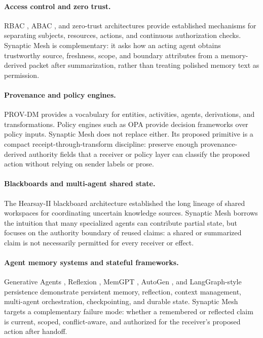\documentclass[11pt]{article}
\begin{document}
\paragraph{Access control and zero trust.}
RBAC \cite{R03_FerraioloKuhn1992_RBAC}, ABAC \cite{R04_Hu2014_ABAC}, and zero-trust
architectures \cite{R05_Rose2020_ZeroTrust} provide established mechanisms for
separating subjects, resources, actions, and continuous authorization checks.
Synaptic Mesh is complementary: it asks how an acting agent obtains trustworthy
source, freshness, scope, and boundary attributes from a memory-derived packet after
summarization, rather than treating polished memory text as permission.

\paragraph{Provenance and policy engines.}
PROV-DM \cite{R07_MoreauMissier2013_PROVDM} provides a vocabulary for entities,
activities, agents, derivations, and transformations. Policy engines such as OPA
\cite{R08_OpenPolicyAgent2026_Docs} provide decision frameworks over policy inputs.
Synaptic Mesh does not replace either. Its proposed primitive is a compact
receipt-through-transform discipline: preserve enough provenance-derived authority
fields that a receiver or policy layer can classify the proposed action without
relying on sender labels or prose.

\paragraph{Blackboards and multi-agent shared state.}
The Hearsay-II blackboard architecture \cite{R10_Erman1980_HearsayII} established
the long lineage of shared workspaces for coordinating uncertain knowledge sources.
Synaptic Mesh borrows the intuition that many specialized agents can contribute
partial state, but focuses on the authority boundary of reused claims: a shared or
summarized claim is not necessarily permitted for every receiver or effect.

\paragraph{Agent memory systems and stateful frameworks.}
Generative Agents \cite{R12_Park2023_GenerativeAgents}, Reflexion
\cite{R13_Shinn2023_Reflexion}, MemGPT \cite{R14_Packer2023_MemGPT}, AutoGen
\cite{R15_Wu2023_AutoGen}, and LangGraph-style persistence
\cite{R16_LangGraph2026_Persistence} demonstrate persistent memory, reflection,
context management, multi-agent orchestration, checkpointing, and durable state.
Synaptic Mesh targets a complementary failure mode: whether a remembered or reflected
claim is current, scoped, conflict-aware, and authorized for the receiver's proposed
action after handoff.
\end{document}
